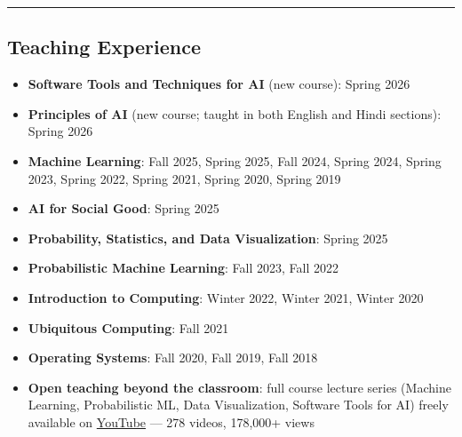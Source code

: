 \documentclass[letter,10pt]{article}
\begin{document}
\ifcvshort\else
\vspace{0.5em}
\noindent\rule{\textwidth}{0.5pt}
\vspace{-0.2em}
\fi

\subsection*{\textbf{Teaching Experience}}
\vspace{-0.4em}
\begin{itemize}
\item[] \textbf{Software Tools and Techniques for AI} (new course): Spring 2026
\item[] \textbf{Principles of AI} (new course; taught in both English and Hindi sections): Spring 2026
\item[] \textbf{Machine Learning}: Fall 2025, Spring 2025, Fall 2024, Spring 2024, Spring 2023, Spring 2022, Spring 2021, Spring 2020, Spring 2019
\item[] \textbf{AI for Social Good}: Spring 2025
\item[] \textbf{Probability, Statistics, and Data Visualization}: Spring 2025
\item[] \textbf{Probabilistic Machine Learning}: Fall 2023, Fall 2022
\item[] \textbf{Introduction to Computing}: Winter 2022, Winter 2021, Winter 2020
\item[] \textbf{Ubiquitous Computing}: Fall 2021
\item[] \textbf{Operating Systems}: Fall 2020, Fall 2019, Fall 2018
\item[] \textbf{Open teaching beyond the classroom}: full course lecture series (Machine Learning, Probabilistic ML, Data Visualization, Software Tools for AI) freely available on \href{https://www.youtube.com/@NipunBatra0}{YouTube} --- 278 videos, 178,000+ views
  

\end{itemize}
\end{document}
